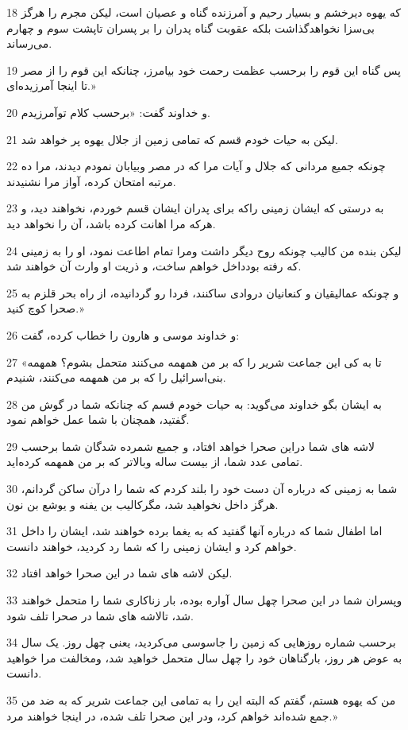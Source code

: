 \par 18 که یهوه دیرخشم و بسیار رحیم و آمرزنده گناه و عصیان است، لیکن مجرم را هرگز بی‌سزا نخواهدگذاشت بلکه عقوبت گناه پدران را بر پسران تاپشت سوم و چهارم می‌رساند.
\par 19 پس گناه این قوم را برحسب عظمت رحمت خود بیامرز، چنانکه این قوم را از مصر تا اینجا آمرزیده‌ای.»
\par 20 و خداوند گفت: «برحسب کلام توآمرزیدم.
\par 21 لیکن به حیات خودم قسم که تمامی زمین از جلال یهوه پر خواهد شد.
\par 22 چونکه جمیع مردانی که جلال و آیات مرا که در مصر وبیابان نمودم دیدند، مرا ده مرتبه امتحان کرده، آواز مرا نشنیدند.
\par 23 به درستی که ایشان زمینی راکه برای پدران ایشان قسم خوردم، نخواهند دید، و هرکه مرا اهانت کرده باشد، آن را نخواهد دید.
\par 24 لیکن بنده من کالیب چونکه روح دیگر داشت ومرا تمام اطاعت نمود، او را به زمینی که رفته بودداخل خواهم ساخت، و ذریت او وارث آن خواهند شد.
\par 25 و چونکه عمالیقیان و کنعانیان دروادی ساکنند، فردا رو گردانیده، از راه بحر قلزم به صحرا کوچ کنید.»
\par 26 و خداوند موسی و هارون را خطاب کرده، گفت:
\par 27 «تا به کی این جماعت شریر را که بر من همهمه می‌کنند متحمل بشوم؟ همهمه بنی‌اسرائیل را که بر من همهمه می‌کنند، شنیدم.
\par 28 به ایشان بگو خداوند می‌گوید: به حیات خودم قسم که چنانکه شما در گوش من گفتید، همچنان با شما عمل خواهم نمود.
\par 29 لاشه های شما دراین صحرا خواهد افتاد، و جمیع شمرده شدگان شما برحسب تمامی عدد شما، از بیست ساله وبالاتر که بر من همهمه کرده‌اید.
\par 30 شما به زمینی که درباره آن دست خود را بلند کردم که شما را درآن ساکن گردانم، هرگز داخل نخواهید شد، مگرکالیب بن یفنه و یوشع بن نون.
\par 31 اما اطفال شما که درباره آنها گفتید که به یغما برده خواهند شد، ایشان را داخل خواهم کرد و ایشان زمینی را که شما رد کردید، خواهند دانست.
\par 32 لیکن لاشه های شما در این صحرا خواهد افتاد.
\par 33 وپسران شما در این صحرا چهل سال آواره بوده، بار زناکاری شما را متحمل خواهند شد، تالاشه های شما در صحرا تلف شود.
\par 34 برحسب شماره روزهایی که زمین را جاسوسی می‌کردید، یعنی چهل روز. یک سال به عوض هر روز، بارگناهان خود را چهل سال متحمل خواهید شد، ومخالفت مرا خواهید دانست.
\par 35 من که یهوه هستم، گفتم که البته این را به تمامی این جماعت شریر که به ضد من جمع شده‌اند خواهم کرد، ودر این صحرا تلف شده، در اینجا خواهند مرد.»

